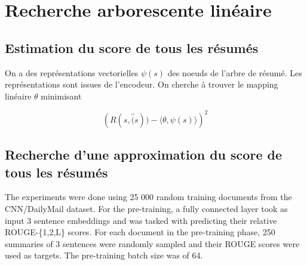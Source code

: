 \chapter{Recherche arborescente linéaire}
\label{chap:linmcts}                   %

\section{Estimation du score de tous les résumés}

On a des représentations vectorielles $\psi(s)$ des noeuds
de l'arbre de résumé.
Les représentations sont issues de l'encodeur.
On cherche à trouver le mapping linéaire $\theta$ minimisant

\begin{equation}
    \left( R(s, \hat(s)) - \langle \theta, \psi(s)\rangle \right)^2
\end{equation}


\section{Recherche d'une approximation du score de tous les résumés}


The experiments were done using 25 000 random training documents from the CNN/DailyMail dataset.
For the pre-training, a fully connected layer took as input 3 sentence embeddings and was tasked with predicting their relative ROUGE-\{1,2,L\} scores.
For each document in the pre-training phase, 250 summaries of 3 sentences were randomly sampled and their ROUGE scores were used as targets.
The pre-training batch size was of 64.

